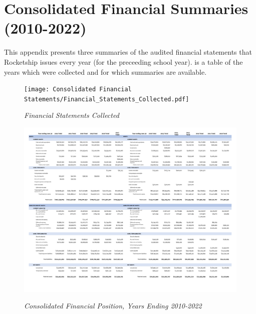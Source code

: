 
\chapter{Consolidated Financial Summaries (2010-2022)}\label{ch:consolidated_financial_summaries}\indent

This appendix presents three summaries of the audited financial statements that Rocketship issues every year (for the preceeding school year).  is a table of the years which were collected and for which summaries are available.

\begin{figure}[hbt]
    \caption[Financial Statements Collected ]{\textit{Financial Statements Collected}}\label{fig:financial-statements-collected} %
    \texttt{[image: Consolidated Financial Statements/Financial\_Statements\_Collected.pdf]}\\ %
\end{figure}

\begin{figure}
  \caption[Consolidated Financial Position, Years Ending 2010–2022]{\textit{Consolidated Financial Position, Years Ending 2010-2022}}\label{fig:consolidated_financial_position_2010-2022} %
\includegraphics[width=\textheight]{Consolidated_Financial_Statements/Consolidated_Financial_Position_Years_2010-2022-2up.pdf}\\ %
\end{figure}

